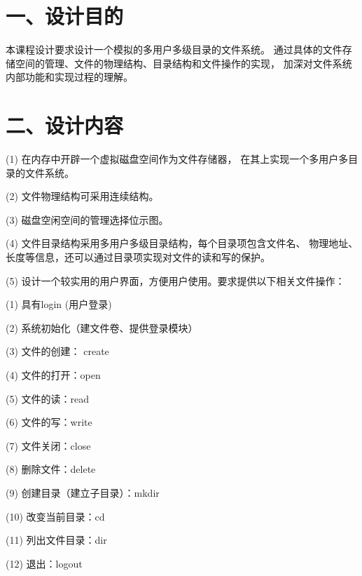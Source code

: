 \documentclass[12bp]{guo}
\begin{document}
\section{一、设计目的}

本课程设计要求设计一个模拟的多用户多级目录的文件系统。
通过具体的文件存储空间的管理、文件的物理结构、目录结构和文件操作的实现，
加深对文件系统内部功能和实现过程的理解。

\section{二、设计内容}

\begin{description}
    \item{(1)} 在内存中开辟一个虚拟磁盘空间作为文件存储器，
               在其上实现一个多用户多目录的文件系统。
               
    \item{(2)} 文件物理结构可采用连续结构。 
        
    \item{(3)} 磁盘空闲空间的管理选择位示图。 
        
    \item{(4)} 文件目录结构采用多用户多级目录结构，每个目录项包含文件名、
               物理地址、长度等信息，还可以通过目录项实现对文件的读和写的保护。 
               
    \item{(5)} 设计一个较实用的用户界面，方便用户使用。要求提供以下相关文件操作： 
        
        \begin{description}
            \item{(1)} 具有login (用户登录) 
            \item{(2)} 系统初始化（建文件卷、提供登录模块）
            \item{(3)} 文件的创建： create 
            \item{(4)} 文件的打开：open
            \item{(5)} 文件的读：read
            \item{(6)} 文件的写：write
            \item{(7)} 文件关闭：close
            \item{(8)} 删除文件：delete
            \item{(9)} 创建目录（建立子目录）：mkdir
            \item{(10)} 改变当前目录：cd
            \item{(11)} 列出文件目录：dir
            \item{(12)} 退出：logout
        \end{description}
\end{description}
\end{document}

